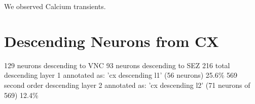 We observed Calcium transients. 


    


        
        

\section{Descending Neurons from CX}
            129 neurons descending to VNC
            93 neurons descending to SEZ
            216 total descending
            layer 1 annotated as: 'cx descending l1' (56 neurons) 25.6\%
            569 second order descending
            layer 2 annotated as: 'cx descending l2' (71 neurons of 569) 12.4\%



